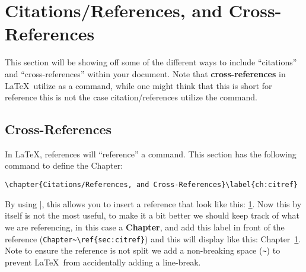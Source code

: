 \chapter{Citations/References, and Cross-References}\label{ch:citref}
	This section will be showing off some of the different ways to include \enquote{citations} and \enquote{cross-references} within your document.
	Note that \textbf{cross-references} in \LaTeX\ utilize  as a command, while one might think that this is short for reference this is not the case citation/references utilize the  command.
	\section{Cross-References}
		In \LaTeX, references will \enquote{reference} a  command. 
		This section has the following command to define the Chapter:
		\begin{Center}
			\lstinline|\chapter{Citations/References, and Cross-References}\label{ch:citref}|
		\end{Center}
		By using |, this allows you to insert a reference that look like this: \ref{ch:citref}.
		Now this by itself is not the most useful, to make it a bit better we should keep track of what we are referencing, in this case a \textbf{Chapter}, and add this label in front of the reference (\lstinline|Chapter~\ref{sec:citref}|) and this will display like this: Chapter~\ref{ch:citref}.
		Note to ensure the reference is not split we add a non-breaking space (\lstinline|~|) to prevent \LaTeX\ from accidentally adding a line-break.

